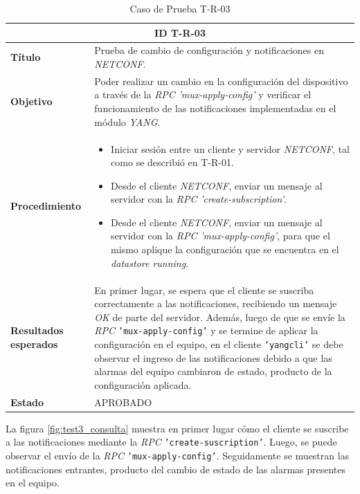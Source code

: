   \begin{table}[H]
    \centering
    \begin{tabular}{ |m{2.5cm}|m{11cm}|  }
    \hline
    \multicolumn{2}{|c|}{ \textbf{ID T-R-03} } \\
    \hline
    \centering
    \textbf{Título} & Prueba de cambio de configuración y notificaciones en \textit{NETCONF}. \\
    \hline
    \centering
    \textbf{Objetivo} & Poder realizar un cambio en la configuración del dispositivo a través de la \textit{RPC} \textit{'mux-apply-config'} y verificar el funcionamiento de las notificaciones implementadas en el módulo \textit{YANG}.  \\
    \hline
    \centering
    \textbf{Procedimiento} & \begin{itemize}
      \item Iniciar sesión entre un cliente y servidor \textit{NETCONF}, tal como se describió en T-R-01.
      \item Desde el cliente \textit{NETCONF}, enviar un mensaje al servidor con la \textit{RPC} \textit{'create-subscription'}.
      \item Desde el cliente \textit{NETCONF}, enviar un mensaje al servidor con la \textit{RPC} \textit{'mux-apply-config'}, para que el mismo aplique la configuración que se encuentra en el \textit{datastore running}.
    \end{itemize}     \\
    \hline
    \centering
    \textbf{Resultados esperados} & 
    En primer lugar, se espera que el cliente se suscriba correctamente a las notificaciones, recibiendo un mensaje \textit{OK} de parte del servidor. 
Además, luego de que se envíe la \textit{RPC} \texttt{'mux-apply-config'} y se termine de aplicar la configuración en el equipo, en el cliente \texttt{'yangcli'} se debe observar el ingreso de las notificaciones debido a que las alarmas del equipo cambiaron de estado, producto de la configuración aplicada. 
      \\
    
      \hline
    \centering
      \textbf{Estado}    & APROBADO  \\
    \hline
    \end{tabular}
    
    \caption{Caso de Prueba T-R-03}
    \label{tab:TR03}
    \end{table}


  La figura \ref{fig:test3_consulta} muestra en primer lugar cómo el cliente se suscribe a las notificaciones mediante la  \textit{RPC} \texttt{'create-suscription'}. Luego, se puede observar el envío de la  \textit{RPC} \texttt{'mux-apply-config'}. Seguidamente se muestran las notificaciones entrantes, producto del cambio de estado de las alarmas presentes en el equipo.
  
